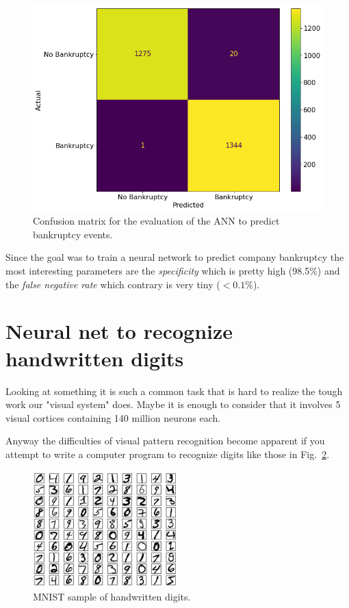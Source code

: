 \begin{figure}[htbp]
	\centering
	\includegraphics[width=0.7\linewidth]{figures/confusion_matrix}
	\caption{Confusion matrix for the evaluation of the ANN to predict bankruptcy events.}
	\label{fig:confusion_matrix}
\end{figure}

Since the goal was to train a neural network to predict company bankruptcy the most interesting parameters are the \emph{specificity} which is pretty high (98.5\%) and the \emph{false negative rate} which contrary is very tiny ($\lt 0.1\%$).

\section{Neural net to recognize handwritten digits}
\label{neural-net-to-recognize-handwritten-digits}

Looking at something it is such a common task that is hard to realize the tough work our "visual system" does.
Maybe it is enough to consider that it involves 5 visual cortices containing 140 million neurons each. 

Anyway the difficulties of visual pattern recognition become apparent if you attempt to write a computer program to recognize digits like those in Fig.~\ref{fig:mnist}.

\begin{figure}[b]
\centering
\includegraphics[width=0.5\textwidth]{figures/mnist_100_digits}
\caption{MNIST sample of handwritten digits.}
\label{fig:mnist}
\end{figure}

